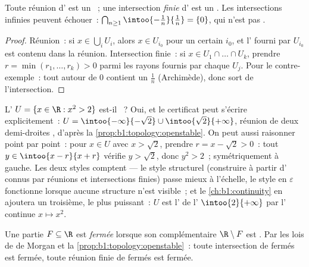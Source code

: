 \begin{proposition}\label{prop:b1:topology:openstable}
Toute réunion d' est un ~; une intersection \emph{finie}
d' est un . Les intersections infinies peuvent échouer~:
$\bigcap_{n \geq 1} \intoo{-\frac 1n}{\frac 1n} = \{0\}$, qui n'est pas .
\end{proposition}

\begin{proof}
Réunion~: si $x \in \bigcup_i U_i$, alors $x \in U_{i_0}$ pour un
certain $i_0$, et l' fourni par $U_{i_0}$ est contenu dans la
réunion. Intersection finie~: si $x \in U_1 \cap \dots \cap U_k$,
prendre $r = \min(r_1, \dots, r_k) > 0$ parmi les rayons fournis par
chaque $U_j$. Pour le contre-exemple~: tout  autour de $0$
contient un $\frac{1}{n}$ (Archimède), donc sort de l'intersection.
\end{proof}

\begin{example}\label{ex:b1:topology:radii}
L' $U = \{x \in \R : x^2 > 2\}$ est-il ~? Oui, et le
certificat peut s'écrire explicitement~: $U = \intoo{-\infty}{-\sqrt2}
\cup \intoo{\sqrt2}{+\infty}$, réunion de deux demi-droites
,  d'après la \cref{prop:b1:topology:openstable}. On peut
aussi raisonner point par point~: pour $x \in U$ avec $x > \sqrt 2$,
prendre $r = x - \sqrt2 > 0$~: tout $y \in \intoo{x - r}{x + r}$
vérifie $y > \sqrt 2$, donc $y^2 > 2$~; symétriquement à gauche.
Les deux styles comptent --- le style structurel (construire à
partir d' connus par réunions et intersections finies) passe
mieux à l'échelle, le style en $\varepsilon$ fonctionne lorsque aucune
structure n'est visible~; et le \cref{ch:b1:continuity} en ajoutera un
troisième, le plus puissant~: $U$ est l' de l'
$\intoo{2}{+\infty}$ par l' continue $x \mapsto x^2$.
\end{example}

\begin{definition}[Fermé]\label{def:b1:topology:closed}
Une partie $F \subseteq \R$ est \emph{fermée} lorsque son
complémentaire $\R \setminus F$ est . Par les lois de de Morgan
et la \cref{prop:b1:topology:openstable}~: toute intersection de fermés
est fermée, toute réunion finie de fermés est fermée.
\end{definition}

